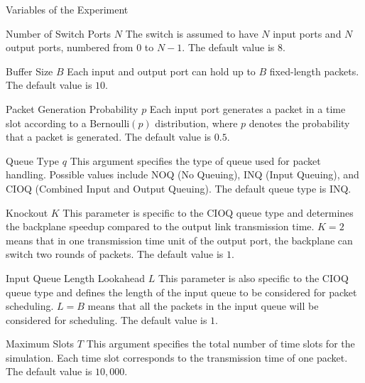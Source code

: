 \begin{section}{Variables of the Experiment}
    \begin{subsection}{Number of Switch Ports $N$}
        The switch is assumed to have $N$ input ports and $N$ output ports, numbered from $0$ to $N-1$. The default value is $8$.
    \end{subsection}
    
    \begin{subsection}{Buffer Size $B$}
        Each input and output port can hold up to $B$ fixed-length packets. The default value is $10$.
    \end{subsection}
    
    \begin{subsection}{Packet Generation Probability $p$}
        Each input port generates a packet in a time slot according to a Bernoulli$(p)$ distribution, where $p$ denotes the probability that a packet is generated. The default value is $0.5$.
    \end{subsection}
    
    \begin{subsection}{Queue Type $q$}
        This argument specifies the type of queue used for packet handling. Possible values include NOQ (No Queuing), INQ (Input Queuing), and CIOQ (Combined Input and Output Queuing). The default queue type is INQ.
    \end{subsection}
    
    \begin{subsection}{Knockout $K$}
        This parameter is specific to the CIOQ queue type and determines the backplane speedup compared to the output link transmission time. $K=2$ means that in one transmission time unit of the output port, the backplane can switch two rounds of packets. The default value is $1$.
    \end{subsection}
    
    \begin{subsection}{Input Queue Length Lookahead $L$}
        This parameter is also specific to the CIOQ queue type and defines the length of the input queue to be considered for packet scheduling. $L=B$ means that all the packets in the input queue will be considered for scheduling. The default value is $1$.
    \end{subsection}
    
    \begin{subsection}{Maximum Slots $T$}
        This argument specifies the total number of time slots for the simulation. Each time slot corresponds to the transmission time of one packet. The default value is $10,000$.
    \end{subsection}

\end{section}

